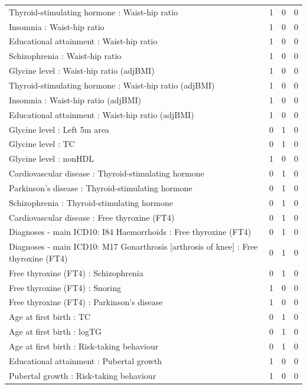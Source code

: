 \begin{table}[ht]
\begin{tabular}{lrrr}
  Thyroid-stimulating hormone  : Waist-hip ratio  &   1 &   0 &   0 \\ 
  Insomnia : Waist-hip ratio  &   1 &   0 &   0 \\ 
  Educational attainment : Waist-hip ratio  &   1 &   0 &   0 \\ 
  Schizophrenia : Waist-hip ratio  &   1 &   0 &   0 \\ 
  Glycine level  : Waist-hip ratio (adjBMI) &   1 &   0 &   0 \\ 
  Thyroid-stimulating hormone  : Waist-hip ratio (adjBMI) &   1 &   0 &   0 \\ 
  Insomnia : Waist-hip ratio (adjBMI) &   1 &   0 &   0 \\ 
  Educational attainment : Waist-hip ratio (adjBMI) &   1 &   0 &   0 \\ 
  Glycine level  : Left 5m area &   0 &   1 &   0 \\ 
  Glycine level  : TC &   0 &   1 &   0 \\ 
  Glycine level  : nonHDL &   1 &   0 &   0 \\ 
  Cardiovascular disease : Thyroid-stimulating hormone  &   0 &   1 &   0 \\ 
  Parkinson's disease : Thyroid-stimulating hormone  &   0 &   1 &   0 \\ 
  Schizophrenia : Thyroid-stimulating hormone  &   0 &   1 &   0 \\ 
  Cardiovascular disease : Free thyroxine (FT4) &   0 &   1 &   0 \\ 
  Diagnoses - main ICD10: I84 Haemorrhoids : Free thyroxine (FT4) &   0 &   1 &   0 \\ 
  Diagnoses - main ICD10: M17 Gonarthrosis [arthrosis of knee] : Free thyroxine (FT4) &   0 &   1 &   0 \\ 
  Free thyroxine (FT4) : Schizophrenia &   0 &   1 &   0 \\ 
  Free thyroxine (FT4) : Snoring &   1 &   0 &   0 \\ 
  Free thyroxine (FT4) : Parkinson's disease &   1 &   0 &   0 \\ 
  Age at first birth  : TC &   0 &   1 &   0 \\ 
  Age at first birth  : logTG &   0 &   1 &   0 \\ 
  Age at first birth  : Risk-taking behaviour &   0 &   1 &   0 \\ 
  Educational attainment : Pubertal growth  &   1 &   0 &   0 \\ 
  Pubertal growth  : Risk-taking behaviour &   1 &   0 &   0 \\ 

\end{tabular}
\end{table}
